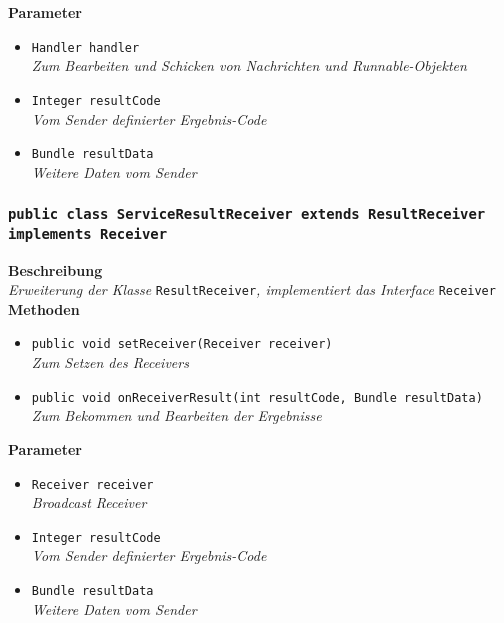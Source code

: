 \documentclass[a4paper]{scrreprt}
\begin{document}
                \textbf{Parameter}
                \begin{itemize}
        		\item\texttt{Handler handler}\\ 
                \textit{Zum Bearbeiten und Schicken von Nachrichten und Runnable-Objekten}\\
				\item\texttt{Integer resultCode}\\ 
                \textit{Vom Sender definierter Ergebnis-Code}\\
                \item\texttt{Bundle resultData}\\ 
                \textit{Weitere Daten vom Sender }\\
                \end{itemize}
                
        \subsubsection{\texttt{public class ServiceResultReceiver extends ResultReceiver implements Receiver}}
               
               	\textbf{Beschreibung} \\
      	        \textit{Erweiterung der Klasse} \texttt{ResultReceiver}\textit{, implementiert das Interface} \texttt{Receiver}\\
                
                \textbf{Methoden}
                \begin{itemize}
        		\item\texttt{{public void setReceiver(Receiver receiver)}}\\
                \textit{Zum Setzen des Receivers}\\
                \item\texttt{{public void onReceiverResult(int resultCode, Bundle resultData)}}\\
                \textit{Zum Bekommen und Bearbeiten der Ergebnisse}\\
                \end{itemize}
                
                \textbf{Parameter}
                \begin{itemize}
        		\item\texttt{Receiver receiver}\\ 
                \textit{Broadcast Receiver}\\
				\item\texttt{Integer resultCode}\\ 
                \textit{Vom Sender definierter Ergebnis-Code}\\
                \item\texttt{Bundle resultData}\\ 
                \textit{Weitere Daten vom Sender }\\
                \end{itemize}
        
\end{document}
